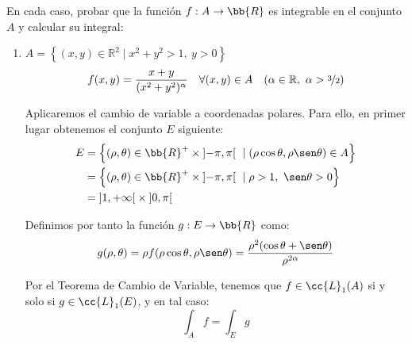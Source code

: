\begin{ejercicio}
    En cada caso, probar que la función \( f:A\to\bb{R} \) es integrable en el conjunto \( A \) y calcular su integral:

    \begin{enumerate}
        \item \( A = \left\{ (x, y) \in \mathbb{R}^2 \mid x^2 + y^2 > 1 ,~y > 0 \right\} \)
        \[ f(x, y) = \frac{x + y}{(x^2 + y^2)^\alpha} \quad \forall (x, y) \in A \quad (\alpha \in \mathbb{R},~\alpha > \nicefrac{3}{2}) \]

        Aplicaremos el cambio de variable a coordenadas polares. Para ello, en primer
        lugar obtenemos el conjunto $E$ siguiente:
        \begin{align*}
            E &= \left\{ (\rho, \theta) \in \bb{R}^+\times \left]-\pi, \pi\right[ ~\mid (\rho\cos\theta, \rho\sen\theta) \in A \right\} \\
            &= \left\{ (\rho, \theta) \in \bb{R}^+\times \left]-\pi, \pi\right[ ~\mid \rho > 1 ,~\sen\theta > 0 \right\} \\
            &= \left] 1, +\infty \right[ \times \left] 0, \pi \right[
        \end{align*}

        Definimos por tanto la función $g: E \to \bb{R}$ como:
        \begin{equation*}
            g(\rho, \theta) = \rho f(\rho\cos\theta, \rho\sen\theta) = \frac{\rho^2(\cos\theta + \sen\theta)}{\rho^{2\alpha}}
        \end{equation*}

        Por el Teorema de Cambio de Variable, tenemos que $f\in \cc{L}_1(A)$ si y solo si $g\in \cc{L}_1(E)$, y en tal caso:
        \begin{equation*}
            \int_A f = \int_E g
        \end{equation*}


\end{enumerate}
\end{ejercicio}

